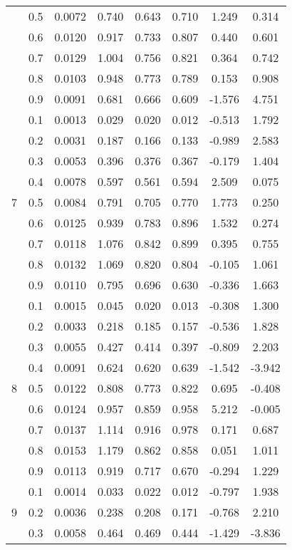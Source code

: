 \documentclass[11pt,a4paper]{report}
\begin{document}
\begin{longtable}{ | c | c || c | c | c | c | c | c | }
 & 0.5 & 0.0072 & 0.740 & 0.643 & 0.710 & 1.249 & 0.314 \\
 & 0.6 & 0.0120 & 0.917 & 0.733 & 0.807 & 0.440 & 0.601 \\
 & 0.7 & 0.0129 & 1.004 & 0.756 & 0.821 & 0.364 & 0.742 \\
 & 0.8 & 0.0103 & 0.948 & 0.773 & 0.789 & 0.153 & 0.908 \\
 & 0.9 & 0.0091 & 0.681 & 0.666 & 0.609 & -1.576 & 4.751 \\
 \hline
\multirow{9}{*}{7} & 0.1 & 0.0013 & 0.029 & 0.020 & 0.012 & -0.513 & 1.792 \\
 & 0.2 & 0.0031 & 0.187 & 0.166 & 0.133 & -0.989 & 2.583 \\
 & 0.3 & 0.0053 & 0.396 & 0.376 & 0.367 & -0.179 & 1.404 \\
 & 0.4 & 0.0078 & 0.597 & 0.561 & 0.594 & 2.509 & 0.075 \\
 & 0.5 & 0.0084 & 0.791 & 0.705 & 0.770 & 1.773 & 0.250 \\
 & 0.6 & 0.0125 & 0.939 & 0.783 & 0.896 & 1.532 & 0.274 \\
 & 0.7 & 0.0118 & 1.076 & 0.842 & 0.899 & 0.395 & 0.755 \\
 & 0.8 & 0.0132 & 1.069 & 0.820 & 0.804 & -0.105 & 1.061 \\
 & 0.9 & 0.0110 & 0.795 & 0.696 & 0.630 & -0.336 & 1.663 \\
 \hline
\multirow{9}{*}{8} & 0.1 & 0.0015 & 0.045 & 0.020 & 0.013 & -0.308 & 1.300 \\
 & 0.2 & 0.0033 & 0.218 & 0.185 & 0.157 & -0.536 & 1.828 \\
 & 0.3 & 0.0055 & 0.427 & 0.414 & 0.397 & -0.809 & 2.203 \\
 & 0.4 & 0.0091 & 0.624 & 0.620 & 0.639 & -1.542 & -3.942 \\
 & 0.5 & 0.0122 & 0.808 & 0.773 & 0.822 & 0.695 & -0.408 \\
 & 0.6 & 0.0124 & 0.957 & 0.859 & 0.958 & 5.212 & -0.005 \\
 & 0.7 & 0.0137 & 1.114 & 0.916 & 0.978 & 0.171 & 0.687 \\
 & 0.8 & 0.0153 & 1.179 & 0.862 & 0.858 & 0.051 & 1.011 \\
 & 0.9 & 0.0113 & 0.919 & 0.717 & 0.670 & -0.294 & 1.229 \\
 \hline
\multirow{9}{*}{9} & 0.1 & 0.0014 & 0.033 & 0.022 & 0.012 & -0.797 & 1.938 \\
 & 0.2 & 0.0036 & 0.238 & 0.208 & 0.171 & -0.768 & 2.210 \\
 & 0.3 & 0.0058 & 0.464 & 0.469 & 0.444 & -1.429 & -3.836 \\

\end{longtable}
\end{document}
